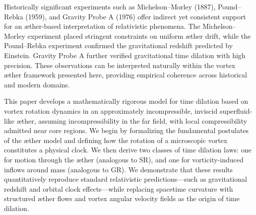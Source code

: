 Historically significant experiments such as Michelson–Morley (1887), Pound–Rebka (1959), and Gravity Probe A (1976) offer indirect yet consistent support for an æther-based interpretation of relativistic phenomena. The Michelson–Morley experiment placed stringent constraints on uniform æther drift, while the Pound–Rebka experiment confirmed the gravitational redshift predicted by Einstein. Gravity Probe A further verified gravitational time dilation with high precision. These observations can be interpreted naturally within the vortex æther framework presented here, providing empirical coherence across historical and modern domains.

This paper develops a mathematically rigorous model for time dilation based on vortex rotation dynamics in an approximately incompressible, inviscid superfluid-like æther, assuming incompressibility in the far field, with local compressibility admitted near core regions. We begin by formalizing the fundamental postulates of the æther model and defining how the rotation of a microscopic vortex constitutes a physical clock. We then derive two classes of time dilation laws: one for motion through the æther (analogous to SR), and one for vorticity-induced inflows around mass (analogous to GR). We demonstrate that these results quantitatively reproduce standard relativistic predictions—such as gravitational redshift and orbital clock effects—while replacing spacetime curvature with structured æther flows and vortex angular velocity fields as the origin of time dilation.